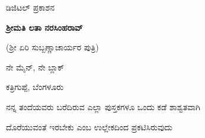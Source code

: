 \thispagestyle{empty}







{
\begin{center}

ಡಿಜಿಟಲ್ ಪ್ರಕಾಶನ 

\bigskip

\bigskip

{\bf ಶ್ರೀಮತಿ ಲತಾ ನರಸಿಂಹರಾವ್}

(ಶ್ರೀ ಏರಿ ಸುಬ್ಬಣ್ಣಾಚಾರ್ಯರ ಪುತ್ರಿ)

ನೇ ಮೈನ್, ನೇ ಬ್ಲಾಕ್

ಕತ್ರಿಗುಪ್ಪೆ, ಬೆಂಗಳೂರು 

\bigskip

{\small ನನ್ನ ತಂದೆಯವರು ಬರೆದಿರುವ ಎಲ್ಲಾ ಪುಸ್ತಕಗಳೂ ಒಂದು ಕಡೆ ಶಾಶ್ವತವಾಗಿ}

{\small ದೊರೆಯುವಂತೆ ಇರಬೇಕು ಎಂಬ ಉಲ್ಲೇಕದಿಂದ ಪ್ರಕಟಿಸಿರುವುದು}

\end{center}

}
